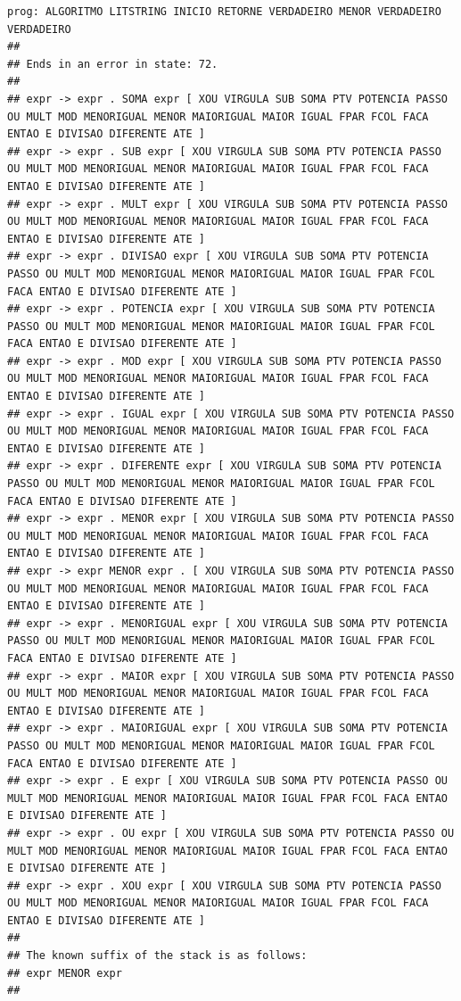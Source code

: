 \documentclass[hidelinks,12pt]{article}
\begin{document}
\begin{lstlisting}
prog: ALGORITMO LITSTRING INICIO RETORNE VERDADEIRO MENOR VERDADEIRO VERDADEIRO 
##
## Ends in an error in state: 72.
##
## expr -> expr . SOMA expr [ XOU VIRGULA SUB SOMA PTV POTENCIA PASSO OU MULT MOD MENORIGUAL MENOR MAIORIGUAL MAIOR IGUAL FPAR FCOL FACA ENTAO E DIVISAO DIFERENTE ATE ]
## expr -> expr . SUB expr [ XOU VIRGULA SUB SOMA PTV POTENCIA PASSO OU MULT MOD MENORIGUAL MENOR MAIORIGUAL MAIOR IGUAL FPAR FCOL FACA ENTAO E DIVISAO DIFERENTE ATE ]
## expr -> expr . MULT expr [ XOU VIRGULA SUB SOMA PTV POTENCIA PASSO OU MULT MOD MENORIGUAL MENOR MAIORIGUAL MAIOR IGUAL FPAR FCOL FACA ENTAO E DIVISAO DIFERENTE ATE ]
## expr -> expr . DIVISAO expr [ XOU VIRGULA SUB SOMA PTV POTENCIA PASSO OU MULT MOD MENORIGUAL MENOR MAIORIGUAL MAIOR IGUAL FPAR FCOL FACA ENTAO E DIVISAO DIFERENTE ATE ]
## expr -> expr . POTENCIA expr [ XOU VIRGULA SUB SOMA PTV POTENCIA PASSO OU MULT MOD MENORIGUAL MENOR MAIORIGUAL MAIOR IGUAL FPAR FCOL FACA ENTAO E DIVISAO DIFERENTE ATE ]
## expr -> expr . MOD expr [ XOU VIRGULA SUB SOMA PTV POTENCIA PASSO OU MULT MOD MENORIGUAL MENOR MAIORIGUAL MAIOR IGUAL FPAR FCOL FACA ENTAO E DIVISAO DIFERENTE ATE ]
## expr -> expr . IGUAL expr [ XOU VIRGULA SUB SOMA PTV POTENCIA PASSO OU MULT MOD MENORIGUAL MENOR MAIORIGUAL MAIOR IGUAL FPAR FCOL FACA ENTAO E DIVISAO DIFERENTE ATE ]
## expr -> expr . DIFERENTE expr [ XOU VIRGULA SUB SOMA PTV POTENCIA PASSO OU MULT MOD MENORIGUAL MENOR MAIORIGUAL MAIOR IGUAL FPAR FCOL FACA ENTAO E DIVISAO DIFERENTE ATE ]
## expr -> expr . MENOR expr [ XOU VIRGULA SUB SOMA PTV POTENCIA PASSO OU MULT MOD MENORIGUAL MENOR MAIORIGUAL MAIOR IGUAL FPAR FCOL FACA ENTAO E DIVISAO DIFERENTE ATE ]
## expr -> expr MENOR expr . [ XOU VIRGULA SUB SOMA PTV POTENCIA PASSO OU MULT MOD MENORIGUAL MENOR MAIORIGUAL MAIOR IGUAL FPAR FCOL FACA ENTAO E DIVISAO DIFERENTE ATE ]
## expr -> expr . MENORIGUAL expr [ XOU VIRGULA SUB SOMA PTV POTENCIA PASSO OU MULT MOD MENORIGUAL MENOR MAIORIGUAL MAIOR IGUAL FPAR FCOL FACA ENTAO E DIVISAO DIFERENTE ATE ]
## expr -> expr . MAIOR expr [ XOU VIRGULA SUB SOMA PTV POTENCIA PASSO OU MULT MOD MENORIGUAL MENOR MAIORIGUAL MAIOR IGUAL FPAR FCOL FACA ENTAO E DIVISAO DIFERENTE ATE ]
## expr -> expr . MAIORIGUAL expr [ XOU VIRGULA SUB SOMA PTV POTENCIA PASSO OU MULT MOD MENORIGUAL MENOR MAIORIGUAL MAIOR IGUAL FPAR FCOL FACA ENTAO E DIVISAO DIFERENTE ATE ]
## expr -> expr . E expr [ XOU VIRGULA SUB SOMA PTV POTENCIA PASSO OU MULT MOD MENORIGUAL MENOR MAIORIGUAL MAIOR IGUAL FPAR FCOL FACA ENTAO E DIVISAO DIFERENTE ATE ]
## expr -> expr . OU expr [ XOU VIRGULA SUB SOMA PTV POTENCIA PASSO OU MULT MOD MENORIGUAL MENOR MAIORIGUAL MAIOR IGUAL FPAR FCOL FACA ENTAO E DIVISAO DIFERENTE ATE ]
## expr -> expr . XOU expr [ XOU VIRGULA SUB SOMA PTV POTENCIA PASSO OU MULT MOD MENORIGUAL MENOR MAIORIGUAL MAIOR IGUAL FPAR FCOL FACA ENTAO E DIVISAO DIFERENTE ATE ]
##
## The known suffix of the stack is as follows:
## expr MENOR expr 
##


\end{lstlisting}
\end{document}
